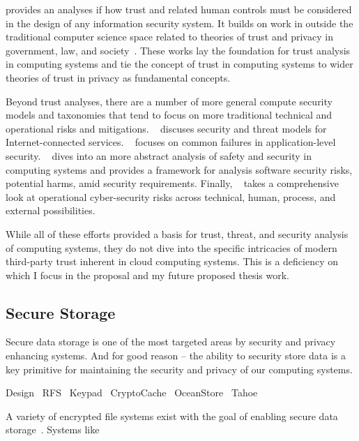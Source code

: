 \cite{flowerday2006} provides an analyses if how trust and related
human controls must be considered in the design of any information
security system. It builds on work in outside the traditional computer
science space related to theories of trust and privacy in government,
law, and society~\cite{Camp2003}. These works lay the foundation for
trust analysis in computing systems and tie the concept of trust in
computing systems to wider theories of trust in privacy as fundamental
concepts.

Beyond trust analyses, there are a number of more general compute
security models and taxonomies that tend to focus on more traditional
technical and operational risks and mitigations. ~\cite{Abbas2005}
discuses security and threat models for Internet-connected
services. ~\cite{Tsipenyuk2005} focuses on common failures in
application-level security. ~\cite{Firesmith2005} dives into an more
abstract analysis of safety and security in computing systems and
provides a framework for analysis software security risks, potential
harms, amid security requirements. Finally, ~\cite{Cebula2010} takes a
comprehensive look at operational cyber-security risks across
technical, human, process, and external possibilities.

While all of these efforts provided a basis for trust, threat, and
security analysis of computing systems, they do not dive into the
specific intricacies of modern third-party trust inherent in cloud
computing systems. This is a deficiency on which I focus in the
proposal and my future proposed thesis work.

\subsection{Secure Storage}
\label{chap:related:storage}

Secure data storage is one of the most targeted areas by security and
privacy enhancing systems. And for good reason -- the ability to
security store data is a key primitive for maintaining the security and
privacy of our computing systems.

Design~\cite{Wulf1974}
RFS~\cite{Dong2011}
Keypad~\cite{Geambasu2011}
CryptoCache~\cite{Jensen2000}
OceanStore~\cite{Kubiatowicz2000}
Tahoe~\cite{Wilcox-O'Hearn2008}



A variety of encrypted file systems exist with the goal of enabling
secure data storage~\cite{Kher2005}. Systems like

